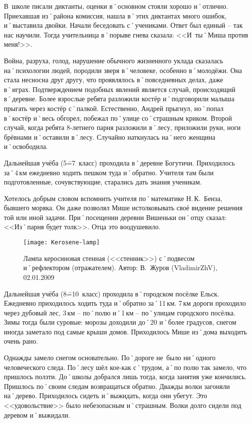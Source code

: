 В~школе писали диктанты, оценки в˚основном стояли хорошо и˚отлично. Приехавшая из˚района комиссия, нашла в˚этих диктантах много ошибок, и˚выставила двойки. Начали беседовать с˚учениками. Ответ был единый \--- так нас научили. Тогда учительница в˚порыве гнева сказала: <<И~ты˚Миша против меня!>>.

Война, разруха, голод, нарушение обычного жизненного уклада сказалась на˚психологии людей, породили зверя в˚человеке, особенно в˚молодёжи. Она стала несносна друг другу, что проявлялось в˚повседневных делах, даже в˚играх. Подтверждением подобных явлений является случай, происходящий в˚деревне. Более взрослые ребята разложили костёр и˚подговорили малыша прыгать через костёр с˚палкой. Естественно, Андрей прыгнул, но˚попал в˚костёр и˚весь обгорел, побежал по˚улице со˚страшным криком. Второй случай, когда ребята 8-летнего парня разложили в˚лесу, приложили руки, ноги брёвнами и˚оставили в˚лесу. Случайно наткнулась на˚него женщина и˚освободила.

Дальнейшая учёба (5\==7~класс) проходила в˚деревне Богутичи. Приходилось за˚4\,км ежедневно ходить пешком туда и˚обратно. Учителя там были подготовленные, сочувствующие, старались дать знания ученикам. 

Хотелось добрым словом вспомнить учителя по˚математике Н.\,К.~Бенза, бывшего моряка. Он даже позволял Мише истолковывать своё видение решения той или иной задачи. При˚посещении деревни Вишеньки он˚отцу сказал: <<Из˚парня будет толк>>. Отца это воодушевило.

\begin{wrapfigure}{O}{.25\textwidth}
\centering
\texttt{[image: Kerosene-lamp]}
\caption{Лампа керосиновая стенная (<<стенник>>) с˚подвесом и˚рефлектором (отражателем). Автор: В.~Журов (VladimirZhV), 02.01.2009}
\label{fig:Kerosene-lamp}
\end{wrapfigure}

Дальнейшая учёба (8\==10~класс) проходила в˚городском посёлке Ельск. Ежедневно приходилось ходить туда и˚обратно за˚11\,км. 7\,км дороги проходило через дубовый лес, 3\,км \--- по˚полю и˚1\,км \--- по˚улицам городского посёлка. Зимы тогда были суровые: морозы доходили до˚20 и˚более градусов, снегом иногда заметало под самые крыши домов. Приходилось Мише из˚дома выходить очень рано. 

Однажды замело снегом основательно. По˚дороге не~было ни˚одного человеческого следа. По˚лесу шёл кое-как с˚трудом, а˚по полю так замело, что пришлось ползти. До˚школы добрался лишь тогда, когда занятия уже кончились. Пришлось по˚своим следам возвращаться обратно. Дважды волки загоняли на˚дерево. Приходилось сидеть и˚выжидать, когда они убегут. Это <<удовольствие>> было небезопасным и˚страшным. Волки долго сидели под деревом и˚выжидали.


